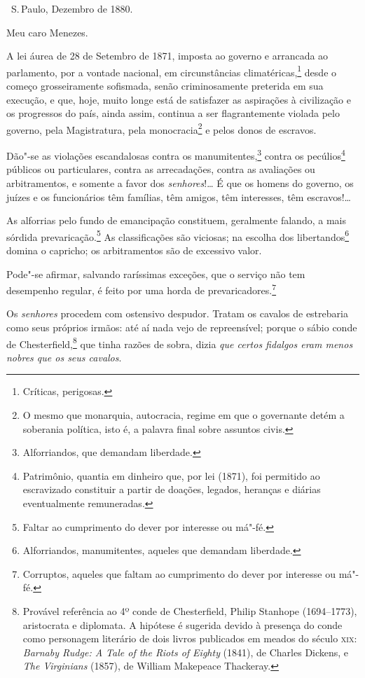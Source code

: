 \hfill\ S.\,Paulo, Dezembro de 1880.\bigskip

\noindent{}Meu caro Menezes.\smallskip

A lei áurea de 28 de Setembro de 1871, imposta ao governo e arrancada ao
parlamento, por a vontade nacional, em circunstâncias
climatéricas,\footnote{Críticas, perigosas.} desde o começo
grosseiramente sofismada, senão criminosamente preterida em sua
execução, e que, hoje, muito longe está de satisfazer as aspirações à
civilização e os progressos do país, ainda assim, continua a ser
flagrantemente violada pelo governo, pela Magistratura, pela
monocracia\footnote{O mesmo que monarquia, autocracia, regime em que o
  governante detém a soberania política, isto é, a palavra final sobre
  assuntos civis.} e pelos donos de escravos.

Dão"-se as violações escandalosas contra os manumitentes,\footnote{
  Alforriandos, que demandam liberdade.} contra os pecúlios\footnote{
  Patrimônio, quantia em dinheiro que, por lei (1871), foi permitido ao
  escravizado constituir a partir de doações, legados, heranças e
  diárias eventualmente remuneradas.} públicos ou particulares, contra
as arrecadações, contra as avaliações ou arbitramentos, e somente a
favor dos \emph{senhores}!\ldots{} É que os homens do governo, os juízes e os
funcionários têm famílias, têm amigos, têm interesses, têm escravos!\ldots{}

As alforrias pelo fundo de emancipação constituem, geralmente falando, a mais sórdida
prevaricação.\footnote{
  Faltar ao cumprimento do dever por interesse ou má"-fé.} As
classificações são viciosas; na escolha dos libertandos\footnote{
  Alforriandos, manumitentes, aqueles que demandam liberdade.} domina o
capricho; os arbitramentos são de excessivo valor.

Pode"-se afirmar, salvando raríssimas exceções, que o serviço não tem
desempenho regular, é feito por uma horda de prevaricadores.\footnote{
  Corruptos, aqueles que   faltam ao cumprimento do dever por interesse ou má"-fé.}

Os \emph{senhores} procedem com ostensivo despudor. Tratam os cavalos de
estrebaria como seus próprios irmãos: até aí nada vejo de repreensível;
porque o sábio conde de Chesterfield,\footnote{Provável referência ao
 4º conde de Chesterfield, Philip Stanhope (1694--1773), aristocrata e
 diplomata. A hipótese é sugerida devido à presença do conde como
  personagem literário de dois livros publicados em meados do século
  \textsc{xix}: \emph{Barnaby Rudge: A Tale of the Riots of Eighty} (1841), de
  Charles Dickens, e \emph{The Virginians} (1857), de William Makepeace
  Thackeray.} que tinha razões de sobra, dizia \emph{que certos fidalgos
eram menos nobres que os seus cavalos}.

